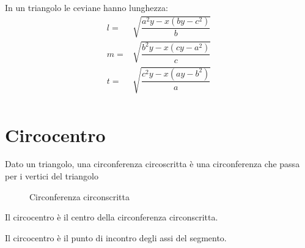 \begin{cor}\label{cor:ceviana1}
In un triangolo le ceviane hanno lunghezza:
\begin{align*}
l=&\sqrt{\dfrac{a^2y-x(by-c^2)}{b}}\\
m=&\sqrt{\dfrac{b^2y-x(cy-a^2)}{c}}\\
t=&\sqrt{\dfrac{c^2y-x(ay-b^2)}{a}}\\
\end{align*}
\end{cor}
\section{Circocentro}\label{sec:circocentro}
\begin{defn}\label{defn:CircCirc1}
Dato un triangolo, una circonferenza circoscritta è una circonferenza che passa per i vertici del triangolo
\end{defn}
\begin{figure}
	\centering

	\caption{Circonferenza circonscritta}
	\label{fig:circumcerchio}
\end{figure}
\begin{defn}[Circocentro]\label{defn:Circocentro1}
Il circocentro è il centro della circonferenza circonscritta. 
\end{defn}
\begin{thm}\label{thm:CircoAsse1}
Il circocentro è il punto di incontro degli assi del segmento.
\end{thm}
